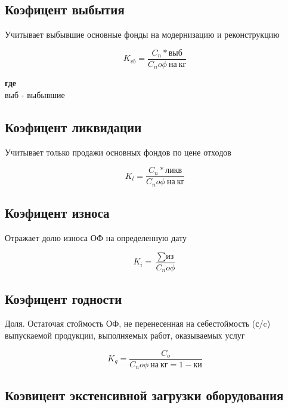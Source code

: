 \documentclass[11pt]{article}
\begin{document}
\subsection{Коэфицент выбытия}
\label{sec:org519eafc}

Учитывает выбывшие основные фонды на модернизацию и реконструкцию


\begin{equation}
  K_{vb} = \frac{C_{n}*\text{выб}}{C_{n}o\phi \  \text{на} \  \text{кг}}
\end{equation}

\textbf{где} \\

\(\text{выб}\) - выбывшие

\subsection{Коэфицент ликвидации}
\label{sec:org36c80eb}

Учитывает только продажи основных фондов по цене отходов

\begin{equation}
  K_{l} = \frac{C_{n}*\text{ликв}}{C_{n}o\phi \  \text{на} \  \text{кг}}
\end{equation}


\subsection{Коэфицент износа}
\label{sec:org4f7c54a}

Отражает долю износа ОФ на определенную дату

\begin{equation}
  K_{i} = \frac{\sum \text{из}}{C_{n}o\phi}
\end{equation}

\subsection{Коэфицент годности}
\label{sec:org09fa633}

Доля. Остаточая стоймость ОФ, не перенесенная на себестоймость (с/c) выпускаемой продукции, выполняемых работ, оказываемых услуг


\begin{equation}
  K_{g} = \frac{C_{o}}{C_{n}o\phi \ \text{на}\ \text{кг} = 1 - \text{ки}}
\end{equation}


\subsection{Коэвицент экстенсивной загрузки оборудования}
\label{sec:org0fa41ac}
\end{document}
